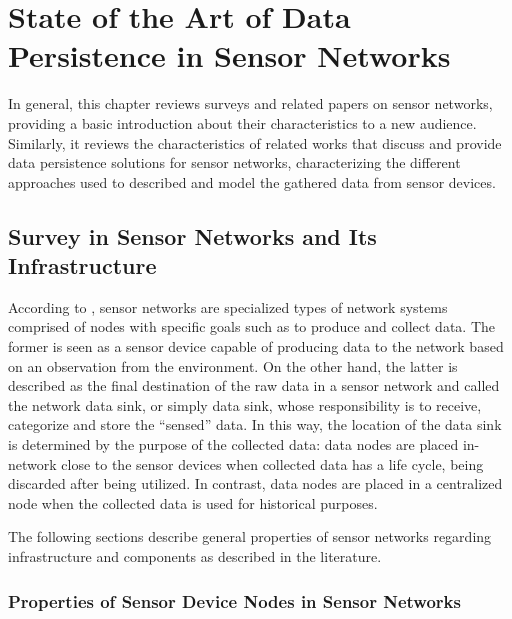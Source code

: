

\chapter{State of the Art of Data Persistence in Sensor Networks}

In general, this chapter reviews surveys and related papers on sensor networks,
providing a basic introduction about their characteristics to a new audience.
Similarly, it reviews the characteristics of related works that discuss and
provide data persistence solutions for sensor networks, characterizing the
different approaches used to described and model the gathered data from sensor
devices.


\section{Survey in Sensor Networks and Its Infrastructure}

According to \cite{sn-intro02}, sensor networks are specialized types of
network systems comprised of nodes with specific goals such as to produce and
collect data. The former is seen as a sensor device capable of producing data
to the network based on an observation from the environment. On the other
hand, the latter is described as the final destination of the raw data in a
sensor network and called the network data sink, or simply data sink, whose
responsibility is to receive, categorize and store the ``sensed'' data. In
this way, the location of the data sink is determined by the purpose of
the collected data: data nodes are placed in-network close to the sensor
devices when collected data has a life cycle, being discarded after being
utilized. In contrast, data nodes are placed in a centralized node when the
collected data is used for historical purposes.

The following sections describe general properties of sensor networks regarding
infrastructure and components as described in the literature.

\subsection{Properties of Sensor Device Nodes in Sensor Networks}

